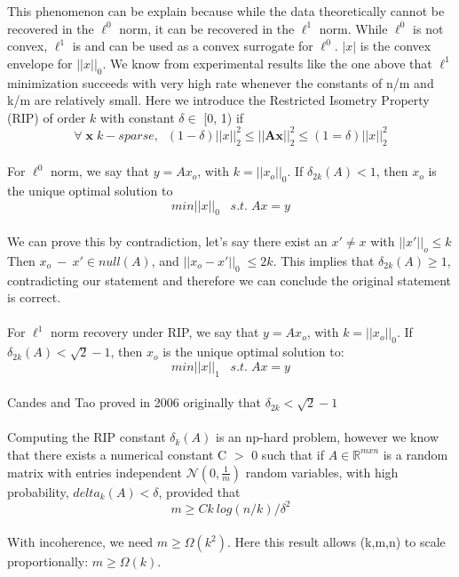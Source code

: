 \documentclass[11pt]{article}
\begin{document}
This phenomenon can be explain because while the data theoretically cannot be recovered in the $\ell^0$ norm, it can be recovered in the $\ell^1$ norm. While $\ell^0$ is not convex, $\ell^1$ is and can be used as a convex surrogate for $\ell^0$. $|x|$ is the convex envelope for $||x||_0$. We know from experimental results like the one above that $\ell^1$  minimization succeeds with very high rate whenever the constants of n/m and k/m are relatively small. Here we introduce the Restricted Isometry Property (RIP) of order $k$ with constant $\delta \in$ [0, 1) if 
\begin{equation}
\forall \; \textbf{x} \;k-sparse,\;\; (1 - \delta)||x||^2_2 \leq ||\textbf{Ax}||^2_2 \leq (1 = \delta)||x||^2_2
\end{equation}\\
For $\ell^0$ norm, we say that $y = Ax_o$, with $k = ||x_o||_0$. If $\delta_{2k}(A) < 1$, then $x_o$ is the unique optimal solution to
\begin{equation}
min ||x||_0 \;\;\; s.t. \; Ax = y
\end{equation}\\
We can prove this by contradiction, let's say there exist an $x' \neq x$ with $||x'||_o \leq k$ Then
$x_o \: - \:x' \in null(A)$, and $||x_o - x'||_0 \; \leq 2k$. This implies that $\delta_{2k}(A) \geq 1$, contradicting our statement and therefore we can conclude the original statement is correct.\\\\
For $\ell^1$ norm recovery under RIP, we say that $y = Ax_o$, with $k = ||x_o||_0$. If $\delta_{2k}(A) < \sqrt{2} - 1$, then $x_o$ is the unique optimal solution to:
\begin{equation}
min ||x||_1 \;\;\; s.t. \; Ax = y
\end{equation}\\
Candes and Tao proved in 2006 originally that $\delta_{2k} < \sqrt{2} - 1$\\\\
Computing the RIP constant $\delta_k(A)$ is an np-hard problem, however we know that there exists a numerical constant C $>$ 0 such that if $A \in \mathbb{R}^{mxn}$ is a random matrix with entries independent $\mathcal{N}(0, \frac{1}{m})$ random variables, with high probability, $delta_k (A) < \delta$, provided that
\begin{equation}
m \geq Ck\: log(n/k) / \delta^2
\end{equation}\\
With incoherence, we need $m \geq \Omega (k^2)$. Here this result allows (k,m,n) to scale proportionally: $m \geq \Omega (k)$.
\newpage
\end{document}
